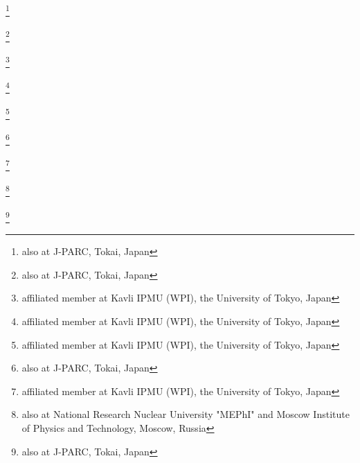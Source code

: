 \author{J.\,Insler}\INSTFI
\author{R.A.\,Intonti}\INSTGF
\author{T.\,Ishida}\thanks{also at J-PARC, Tokai, Japan}\INSTCB
\author{T.\,Ishii}\thanks{also at J-PARC, Tokai, Japan}\INSTCB
\author{E.\,Iwai}\INSTCB
\author{K.\,Iwamoto}\INSTCH
\author{A.\,Izmaylov}\INSTEC\INSTEB
\author{B.\,Jamieson}\INSTGH
\author{M.\,Jiang}\INSTCD
\author{S.\,Johnson}\INSTGB
\author{P.\,Jonsson}\INSTEI
\author{C.K.\,Jung}\thanks{affiliated member at Kavli IPMU (WPI), the University of Tokyo, Japan}\INSTFJ
\author{M.\,Kabirnezhad}\INSTDF
\author{A.C.\,Kaboth}\INSTHC\INSTEH
\author{T.\,Kajita}\thanks{affiliated member at Kavli IPMU (WPI), the University of Tokyo, Japan}\INSTCG
\author{H.\,Kakuno}\INSTGI
\author{J.\,Kameda}\INSTBJ
\author{D.\,Karlen}\INSTG\INSTB
\author{T.\,Katori}\INSTFA
\author{E.\,Kearns}\thanks{affiliated member at Kavli IPMU (WPI), the University of Tokyo, Japan}\INSTFE\INSTHA
\author{M.\,Khabibullin}\INSTEB
\author{A.\,Khotjantsev}\INSTEB
\author{H.\,Kim}\INSTCF
\author{J.\,Kim}\INSTD\INSTB
\author{S.\,King}\INSTFA
\author{J.\,Kisiel}\INSTDI
\author{A.\,Knight}\INSTFD
\author{A.\,Knox}\INSTEJ
\author{T.\,Kobayashi}\thanks{also at J-PARC, Tokai, Japan}\INSTCB
\author{L.\,Koch}\INSTBC
\author{T.\,Koga}\INSTCH
\author{P.P.\,Koller}\INSTEE
\author{A.\,Konaka}\INSTB
\author{L.L.\,Kormos}\INSTEJ
\author{Y.\,Koshio}\thanks{affiliated member at Kavli IPMU (WPI), the University of Tokyo, Japan}\INSTGJ
\author{K.\,Kowalik}\INSTDF
\author{Y.\,Kudenko}\thanks{also at National Research Nuclear University "MEPhI" and Moscow Institute of Physics and Technology, Moscow, Russia}\INSTEB
\author{R.\,Kurjata}\INSTDH
\author{T.\,Kutter}\INSTFI
\author{J.\,Lagoda}\INSTDF
\author{I.\,Lamont}\INSTEJ
\author{M.\,Lamoureux}\INSTI
\author{P.\,Lasorak}\INSTFA
\author{M.\,Laveder}\INSTBF
\author{M.\,Lawe}\INSTEJ
\author{M.\,Licciardi}\INSTBA
\author{T.\,Lindner}\INSTB
\author{Z.J.\,Liptak}\INSTGB
\author{R.P.\,Litchfield}\INSTEI
\author{X.\,Li}\INSTFJ
\author{A.\,Longhin}\INSTBF
\author{J.P.\,Lopez}\INSTGB
\author{T.\,Lou}\INSTCH
\author{L.\,Ludovici}\INSTBD
\author{X.\,Lu}\INSTGG
\author{L.\,Magaletti}\INSTGF
\author{K.\,Mahn}\INSTHB
\author{M.\,Malek}\INSTFB
\author{S.\,Manly}\INSTGD
\author{L.\,Maret}\INSTEG
\author{A.D.\,Marino}\INSTGB
\author{J.F.\,Martin}\INSTF
\author{P.\,Martins}\INSTFA
\author{S.\,Martynenko}\INSTFJ
\author{T.\,Maruyama}\thanks{also at J-PARC, Tokai, Japan}\INSTCB
\author{V.\,Matveev}\INSTEB
\author{K.\,Mavrokoridis}\INSTFC
\author{W.Y.\,Ma}\INSTEI
\author{E.\,Mazzucato}\INSTI
\author{M.\,McCarthy}\INSTH
\author{N.\,McCauley}\INSTFC
\author{K.S.\,McFarland}\INSTGD
